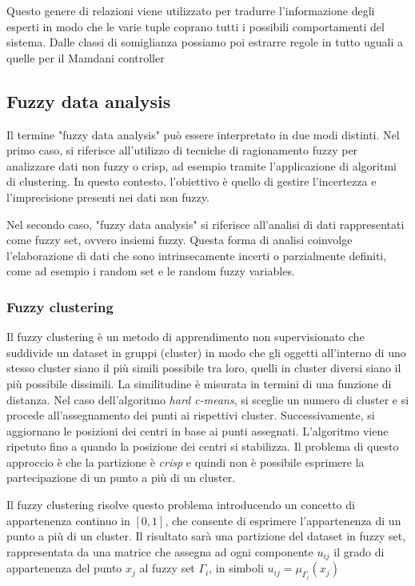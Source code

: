 Questo genere di relazioni viene utilizzato per tradurre l’informazione degli esperti in modo che le varie tuple coprano tutti i possibili comportamenti del sistema. Dalle classi di somiglianza possiamo poi estrarre regole in tutto uguali a quelle per il Mamdani controller

\subsection{Fuzzy data analysis}
Il termine "fuzzy data analysis" può essere interpretato in due modi distinti. Nel primo caso, si riferisce all'utilizzo di tecniche di ragionamento fuzzy per analizzare dati non fuzzy o crisp, ad esempio tramite l'applicazione di algoritmi di clustering. In questo contesto, l'obiettivo è quello di gestire l'incertezza e l'imprecisione presenti nei dati non fuzzy.

Nel secondo caso, "fuzzy data analysis" si riferisce all'analisi di dati rappresentati come fuzzy set, ovvero insiemi fuzzy. Questa forma di analisi coinvolge l'elaborazione di dati che sono intrinsecamente incerti o parzialmente definiti, come ad esempio i random set e le random fuzzy variables.

\subsubsection{Fuzzy clustering}
Il fuzzy clustering è un metodo di apprendimento non supervisionato che suddivide un dataset in gruppi (cluster) in modo che gli oggetti all'interno di uno stesso cluster siano il più simili possibile tra loro, quelli in cluster diversi siano il più possibile dissimili. La similitudine è misurata in termini di una funzione di distanza. Nel caso dell'algoritmo \textit{hard c-means}, si sceglie un numero di cluster e si procede all'assegnamento dei punti ai rispettivi cluster. Successivamente, si aggiornano le posizioni dei centri in base ai punti assegnati. L'algoritmo viene ripetuto fino a quando la posizione dei centri si stabilizza. Il problema di questo approccio è che la partizione è \textit{crisp} e quindi non è possibile esprimere la partecipazione di un punto a più di un cluster. 

Il fuzzy clustering risolve questo problema introducendo un concetto di appartenenza continuo in $[0,1]$, che consente di esprimere l'appartenenza di un punto a più di un cluster. Il risultato sarà una partizione del dataset in fuzzy set, rappresentata da una matrice che assegna ad ogni componente $u_{ij}$ il grado di appartenenza del punto $x_j$ al fuzzy set $\Gamma_i$, in simboli $u_{ij} = \mu_{\Gamma_i}(x_j)$

